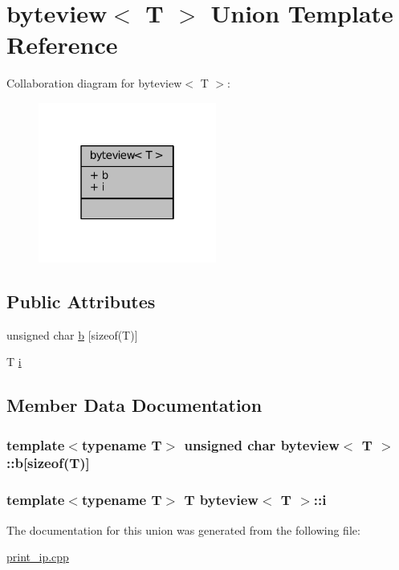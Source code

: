 \hypertarget{unionbyteview}{}\section{byteview$<$ T $>$ Union Template Reference}
\label{unionbyteview}


Collaboration diagram for byteview$<$ T $>$\+:
\nopagebreak
\begin{figure}[H]
\begin{center}
\leavevmode
\includegraphics[width=166pt]{unionbyteview__coll__graph}
\end{center}
\end{figure}
\subsection*{Public Attributes}
\begin{DoxyCompactItemize}
\item 
unsigned char \hyperlink{unionbyteview_af86288b3e2724623c6a8836c07b26d28}{b} \mbox{[}sizeof(T)\mbox{]}
\item 
T \hyperlink{unionbyteview_a34c79afd8afd71191848bd8fa06fd286}{i}
\end{DoxyCompactItemize}


\subsection{Member Data Documentation}
\subsubsection[{\texorpdfstring{b}{b}}]{\setlength{\rightskip}{0pt plus 5cm}template$<$typename T$>$ unsigned char {\bf byteview}$<$ T $>$\+::b\mbox{[}sizeof(T)\mbox{]}}\hypertarget{unionbyteview_af86288b3e2724623c6a8836c07b26d28}{}\label{unionbyteview_af86288b3e2724623c6a8836c07b26d28}
\subsubsection[{\texorpdfstring{i}{i}}]{\setlength{\rightskip}{0pt plus 5cm}template$<$typename T$>$ T {\bf byteview}$<$ T $>$\+::i}\hypertarget{unionbyteview_a34c79afd8afd71191848bd8fa06fd286}{}\label{unionbyteview_a34c79afd8afd71191848bd8fa06fd286}


The documentation for this union was generated from the following file\+:\begin{DoxyCompactItemize}
\item 
\hyperlink{print__ip_8cpp}{print\+\_\+ip.\+cpp}\end{DoxyCompactItemize}
